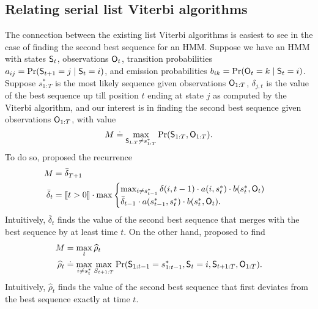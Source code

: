%
\subsection{Relating serial list Viterbi algorithms}

The connection between the existing list Viterbi algorithms is easiest to see in the case of finding the second best sequence for an HMM.
Suppose we have an HMM with states $\mathsf{S}_{t}$, observations $\mathsf{O}_{t}$, transition probabilities $a_{ij} = \Pr( \mathsf{S}_{t+1} = j \mid \mathsf{S}_t = i )$, and emission probabilities $b_{ik} = \Pr( \mathsf{O}_{t} = k \mid \mathsf{S}_t = i )$.
Suppose $s^*_{1:T}$ is the most likely sequence given observations $\mathsf{O}_{1:T}$,
$\delta_{j, t}$ is the value of the best sequence up till position $t$ ending at state $j$ as computed by the Viterbi algorithm,
and our interest is in finding the second best sequence given observations $\mathsf{O}_{1:T}$, with value
$$ M \stackrel{.}{=} \max_{\mathsf{S}_{1:T} \neq s^*_{1 : T}}{\Pr( \mathsf{S}_{1:T}, \mathsf{O}_{1:T} )}. $$
To do so, \citet{seshadri1994list} proposed the recurrence
\begin{equation}
    \label{eqn:att-recurrence}
    \begin{aligned}
        M &= \bar{\delta}_{T+1} \\
        \bar{\delta}_t &= 
        \indicator{t > 0} \cdot
        \max
        \begin{cases}
        \max_{i \neq s^*_{t-1}} \delta(i, t-1) \cdot a( i, s^*_{t} ) \cdot b( s^*_{t}, \OSf_{t} ) \\
        \bar{\delta}_{t - 1} \cdot a( s^*_{t - 1}, s^*_{t} ) \cdot b( s^*_{t}, \OSf_{t} ).
        \end{cases}%
    \end{aligned}    
\end{equation}
Intuitively, $\bar{\delta}_t$ finds the value of the second best sequence that merges with the best sequence by at least time $t$.
On the other hand, \citet{nilsson2001sequentially} proposed to find
\begin{align*}
	M &= \max_t \widehat{\rho}_t \\
	\widehat{\rho}_{t} &\stackrel{.}{=} \max_{i \neq s^*_{t}} \max_{S_{t+1:T}} {\Pr( \mathsf{S}_{1:t-1} = s^*_{1:t-1}, \mathsf{S}_t = i, \mathsf{S}_{t+1:T}, \mathsf{O}_{1:T} )}.
\end{align*}
Intuitively, $\widehat{\rho}_t$ finds the value of the second best sequence that first deviates from the best sequence exactly at time $t$.

